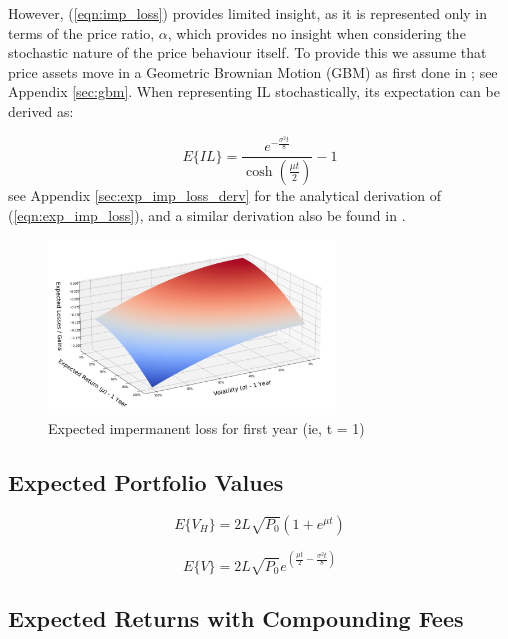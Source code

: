 \documentclass[journal,twocolumn,12pt]{ieeesyscoin}
\begin{document}
However, (\ref{eqn:imp_loss}) provides limited insight, as it is represented only in terms of the price ratio, $\alpha$, which provides no insight when considering the stochastic nature of the price behaviour itself. To provide this we assume that price assets move in a Geometric Brownian Motion (GBM) as first done in \cite{Gui21}; see Appendix \ref{sec:gbm}. When representing IL stochastically, its expectation can be derived as:

\begin{equation}\label{eqn:exp_imp_loss}
  E\{IL\} = \frac{e^{-\frac{\sigma^2 t}{8}}}{\cosh (\frac{\mu t}{2})} - 1
\end{equation}
see Appendix \ref{sec:exp_imp_loss_derv} for the analytical derivation of (\ref{eqn:exp_imp_loss}), and a similar derivation also be found in \cite{Dan22}.

\begin{figure}[h!]
\includegraphics[width=3in]{img/imp_loss.png}
\caption{Expected impermanent loss for first year (ie, t = 1)} 
\label{fig:daosys_protocol}
\end{figure}

\subsection{Expected Portfolio Values}
\label{sec:exp_portfolio_value}

\lipsum[1]

\begin{equation}\label{eqn:held_portfolio}
  E\{V_{H}\} = 2 L \sqrt{P_{0}} (1 + e^{\mu t})
\end{equation}

\begin{equation}\label{eqn:portfolio_outside}
  E\{V\} = 2 L \sqrt{P_{0}}  e^{(\frac{\mu t}{2} - \frac{\sigma^2 t}{8})}
\end{equation}

\subsection{Expected Returns with Compounding Fees}
\label{sec:exp_lp_returns}
\end{document}
